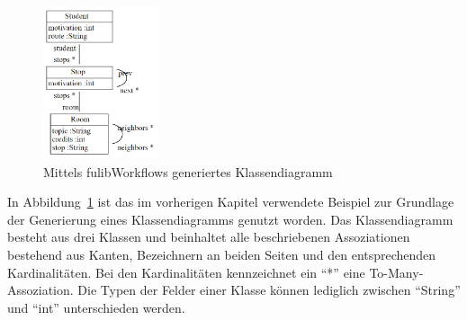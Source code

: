\begin{figure}[ht]
    \centering
    \includegraphics[width=0.3\textwidth]{images/3.1.4/class_diagram}
    \caption{Mittels fulibWorkflows generiertes Klassendiagramm}
    \label{fig:generated-class}
\end{figure}

In Abbildung~\ref{fig:generated-class} ist das im vorherigen Kapitel verwendete Beispiel zur Grundlage der Generierung eines Klassendiagramms genutzt worden.
Das Klassendiagramm besteht aus drei Klassen und beinhaltet alle beschriebenen Assoziationen bestehend aus Kanten, Bezeichnern an beiden Seiten und den entsprechenden
Kardinalitäten.
Bei den Kardinalitäten kennzeichnet ein ``*'' eine To-Many-Assoziation.
Die Typen der Felder einer Klasse können lediglich zwischen ``String'' und ``int'' unterschieden werden.
